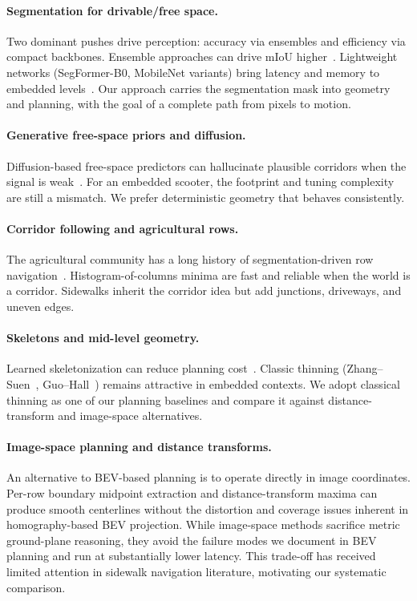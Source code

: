 \documentclass[a4paper,fleqn,10pt]{cas-dc}
\begin{document}
\paragraph{Segmentation for drivable/free space.}
Two dominant pushes drive perception: accuracy via ensembles and efficiency via compact backbones. Ensemble approaches can drive mIoU higher~\cite{shihab2024}. Lightweight networks (SegFormer-B0, MobileNet variants) bring latency and memory to embedded levels~\cite{segformer, edge_optimized_seg, twinlitenet2024}. Our approach carries the segmentation mask into geometry and planning, with the goal of a complete path from pixels to motion.

\paragraph{Generative free-space priors and diffusion.}
Diffusion-based free-space predictors can hallucinate plausible corridors when the signal is weak~\cite{gupta2025diffusion}. For an embedded scooter, the footprint and tuning complexity are still a mismatch. We prefer deterministic geometry that behaves consistently.

\paragraph{Corridor following and agricultural rows.}
The agricultural community has a long history of segmentation-driven row navigation~\cite{orchard_seg_nav, row_nav_survey}. Histogram-of-columns minima are fast and reliable when the world is a corridor. Sidewalks inherit the corridor idea but add junctions, driveways, and uneven edges.

\paragraph{Skeletons and mid-level geometry.}
Learned skeletonization can reduce planning cost~\cite{flores2025skeleton}. Classic thinning (Zhang--Suen~\cite{zhang_suen}, Guo--Hall~\cite{guo_hall}) remains attractive in embedded contexts. We adopt classical thinning as one of our planning baselines and compare it against distance-transform and image-space alternatives.

\paragraph{Image-space planning and distance transforms.}
An alternative to BEV-based planning is to operate directly in image coordinates. Per-row boundary midpoint extraction and distance-transform maxima can produce smooth centerlines without the distortion and coverage issues inherent in homography-based BEV projection. While image-space methods sacrifice metric ground-plane reasoning, they avoid the failure modes we document in BEV planning and run at substantially lower latency. This trade-off has received limited attention in sidewalk navigation literature, motivating our systematic comparison.
\end{document}
